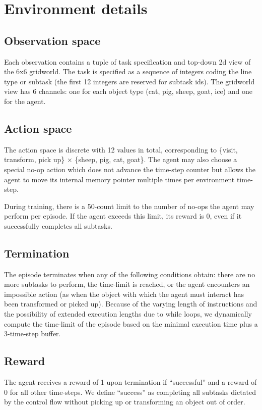\documentclass{article}
\begin{document}
\section{Environment details}
\subsection{Observation space}
Each observation contains a tuple of task specification and top-down 2d view of
the 6x6 gridworld. The task is specified as a sequence of integers coding the
line type or subtask (the first 12 integers are reserved for subtask ids). The
gridworld view has 6 channels: one for each object type (cat, pig, sheep, goat,
ice) and one for the agent.  
\subsection{Action space}
The action space is discrete with 12 values in total, corresponding to \{visit, transform, pick up\} $\times$ \{sheep, pig, cat, goat\}. The agent may also choose a special no-op action which does not advance the time-step counter but allows the agent to move its internal memory pointer  multiple times per environment time-step. 

During training, there is a 50-count limit to the number of no-ops the agent may perform per episode. If the agent exceeds this limit, its reward is 0, even if it successfully completes all subtasks. 
\subsection{Termination}
The episode terminates when any of the following conditions obtain: there are no more subtasks to perform, the time-limit is reached, or the agent encounters an impossible action (as when the object with which the agent must interact has been transformed or picked up).
Because of the varying length of instructions and the possibility of extended execution lengths due to while loops, we dynamically compute the time-limit of the episode based on the minimal execution time plus a 3-time-step buffer.
\subsection{Reward}
The agent receives a reward of 1 upon termination if ``successful'' and a reward of 0 for all other time-steps. We define ``success'' as completing all subtasks dictated by the control flow without picking up or transforming an object out of order.
\end{document}
